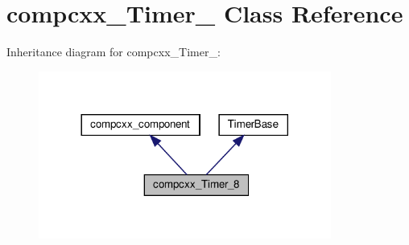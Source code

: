 \hypertarget{classcompcxx__Timer__8}{}\section{compcxx\+\_\+\+Timer\+\_ Class Reference}
\label{classcompcxx__Timer__8}


Inheritance diagram for compcxx\+\_\+\+Timer\+\_\+:\nopagebreak
\begin{figure}[H]
\begin{center}
\leavevmode
\includegraphics[width=272pt]{classcompcxx__Timer__8__inherit__graph}
\end{center}
\end{figure}


